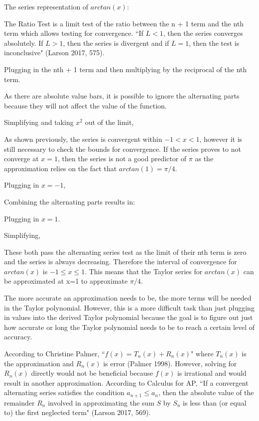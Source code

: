 The series representation of \(arctan(x)\):
 
The Ratio Test is a limit test of the ratio between the n + 1 term and the nth term which allows testing for convergence. ``If \(L < 1\), then the series converges absolutely. If \(L > 1\), then the series is divergent and if \(L = 1\), then the test is inconclusive" (Larson 2017, 575).

Plugging in the nth + 1 term and then multiplying by the reciprocal of the nth term.

As there are absolute value bars, it is possible to ignore the alternating parts because they will not affect the value of the function.

Simplifying and taking \(x^{2}\) out of the limit,


As shown previously, the series is convergent within \(-1 < x < 1\), however it is still necessary to check the bounds for convergence. If the series proves to not converge at \(x = 1\), then the series is not a good predictor of \(\pi\) as the approximation relies on the fact that \(arctan(1) = \pi/4\).


Plugging in \(x = -1\),

Combining the alternating parts results in:

Plugging in \(x = 1\).

Simplifying,

These both pass the alternating series test as the limit of their nth term is zero and the series is always decreasing. Therefore the interval of convergence for \(arctan(x)\) is \( -1 \leq x \leq 1 \). This means that the Taylor series for \(arctan(x)\) can be approximated at x=1 to approximate \(\pi/4\).

The more accurate an approximation needs to be, the more terms will be needed in the Taylor polynomial. However, this is a more difficult task than just plugging in values into the derived Taylor polynomial because the goal is to figure out just how accurate or long the Taylor polynomial needs to be to reach a certain level of accuracy.

According to Christine Palmer, ``\(f(x) = T_{n}(x) + R_{n}(x)\)" where \(T_{n}(x)\) is the approximation and \(R_{n}(x)\) is error (Palmer 1998). However, solving for \(R_{n}(x)\) directly would not be beneficial because \(f(x)\) is irrational and would result in another approximation.
According to Calculus for AP, ``If a convergent alternating series satisfies the condition \(a_{n+1} \leq a_{n} \), then the absolute value of the remainder \(R_{n}\) involved in approximating the sum \(S\) by \(S_{n}\) is less than (or equal to) the first neglected term" (Larson 2017, 569).

